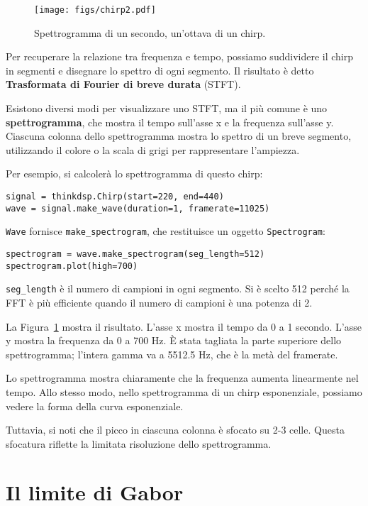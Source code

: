 \documentclass[12pt]{book} \usepackage[width=5.5in,height=8.5in, hmarginratio=3:2,vmarginratio=1:1]{geometry}
\begin{document}
\begin{figure} 

\centerline{\texttt{[image: figs/chirp2.pdf]}} \caption{Spettrogramma di un secondo, un'ottava di un chirp.} \label{fig.chirp2} \end{figure} 

Per recuperare la relazione tra frequenza e tempo, possiamo suddividere il chirp in segmenti e disegnare lo spettro di ogni segmento. Il risultato è detto {\bf Trasformata di Fourier di breve durata} (STFT).

Esistono diversi modi per visualizzare uno STFT, ma il più comune è uno {\bf spettrogramma}, che mostra il tempo sull'asse x e la frequenza sull'asse y. Ciascuna colonna dello spettrogramma mostra lo spettro di un breve segmento, utilizzando il colore o la scala di grigi per rappresentare l'ampiezza.

Per esempio, si calcolerà lo spettrogramma di questo chirp:

\begin{verbatim} 
signal = thinkdsp.Chirp(start=220, end=440)
wave = signal.make_wave(duration=1, framerate=11025)
 \end{verbatim} 

{\tt Wave} fornisce \verb"make_spectrogram", che restituisce un oggetto {\tt Spectrogram}:

\begin{verbatim} 
spectrogram = wave.make_spectrogram(seg_length=512)
spectrogram.plot(high=700)
 \end{verbatim} 

\verb"seg_length" è il numero di campioni in ogni segmento. Si è scelto 512 perché la FFT è più efficiente quando il numero di campioni è una potenza di 2.

La Figura~\ref{fig.chirp2} mostra il risultato. L'asse x mostra il tempo da 0 a 1 secondo. L'asse y mostra la frequenza da 0 a 700 Hz. È stata tagliata la parte superiore dello spettrogramma; l'intera gamma va a 5512.5 Hz, che è la metà del framerate.

Lo spettrogramma mostra chiaramente che la frequenza aumenta linearmente nel tempo. Allo stesso modo, nello spettrogramma di un chirp esponenziale, possiamo vedere la forma della curva esponenziale.

Tuttavia, si noti che il picco in ciascuna colonna è sfocato su 2-3 celle. Questa sfocatura riflette la limitata risoluzione dello spettrogramma.

\section{Il limite di Gabor} \label{gabor} 
\end{document}
